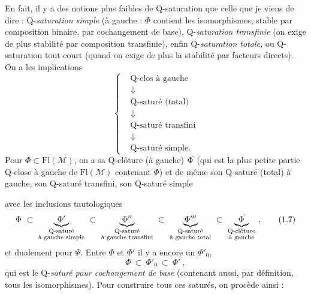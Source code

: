 En fait, il y a des notions plus faibles de Q-saturation que celle que je viens de dire : Q-\textit{saturation simple} (à gauche : $\Phi$ contient les isomorphismes, stable par composition binaire, par cochangement de base), Q-\textit{saturation transfinie} (on exige de plus stabilité par composition transfinie), enfin Q-\textit{saturation totale,} ou Q-saturation tout court (quand on exige de plus la stabilité par facteurs directs). On a les implications
\[
\left\{
\begin{aligned}
&\text{Q-clos à gauche}\\
&\Downarrow\\
&\text{Q-saturé (total)}\\
&\Downarrow\\
&\text{Q-saturé transfini}\\
&\Downarrow\\
&\text{Q-saturé simple.}
\end{aligned}
\right.
\tag*{(1.6)}
\]
Pour $\Phi \subset \mathrm{Fl}(\mathcal{M})$, on a sa Q-clôture (à gauche) $\Phi^{\tilde{}}$ (qui est la plus petite partie Q-close à gauche de $\mathrm{Fl}(\mathcal{M})$ contenant $\Phi$) et de même son Q-saturé (total) à gauche, son Q-saturé transfini, son Q-saturé simple


avec les inclusions tautologiques
\[
\Phi \ \subset \
\underbrace{\Phi'}_{\substack{\text{Q-saturé}\\ \text{à gauche simple}}}
\ \subset \
\underbrace{\Phi''}_{\substack{\text{Q-saturé}\\ \text{à gauche transfini}}}
\ \subset \
\underbrace{\Phi'''}_{\substack{\text{Q-saturé}\\ \text{à gauche total}}}
\ \subset \
\underbrace{\Phi^{\tld}}_{\substack{\text{Q-clôture}\\ \text{à gauche}}}
\ ,
\tag*{(1.7)}
\]
et dualement pour $\Psi$. Entre $\Phi$ et $\Phi'$ il y a encore un $\Phi'_0$,
\[
\Phi \ \subset \ \Phi'_0 \ \subset \ \Phi'\ ,
\tag*{(1.8)}
\]
qui est le Q-\textit{saturé pour cochangement de base} (contenant aussi, par définition, tous les isomorphismes). Pour construire tous ces saturés, on procède ainsi :

